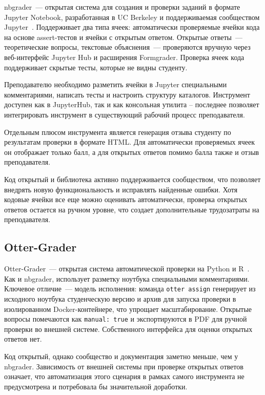 nbgrader~--- открытая система для создания и проверки заданий в формате Jupyter
Notebook, разработанная в UC Berkeley и поддерживаемая сообществом
Jupyter~\cite{nbgrader, nbgrader_github}. Поддерживает два типа ячеек:
автоматически проверяемые ячейки кода на основе assert-тестов и ячейки с
открытым ответом. Открытые ответы~--- теоретические вопросы, текстовые
объяснения~--- проверяются вручную через веб-интерфейс Jupyter Hub и расширения Formgrader.
Проверка ячеек кода поддерживает скрытые тесты, которые не видны студенту.

Преподавателю необходимо разметить ячейки в Jupyter специальными комментариями, написать тесты и настроить
структуру каталогов. Инструмент доступен как в JupyterHub, так и как консольная
утилита -- последнее позволяет интегрировать инструмент в существующий рабочий процесс преподавателя.

Отдельным плюсом инструмента является генерация отзыва студенту по результатам проверки
в формате HTML. Для автоматически проверяемых ячеек он отображает только балл, а для 
открытых ответов помимо балла также и отзыв преподавателя.

Код открытый и библиотека активно поддерживается сообществом, что позволяет внедрять новую функциональность
и исправлять найденные ошибки.
Хотя кодовые ячейки все еще можно оценивать автоматически, проверка открытых ответов остается на ручном уровне, что 
создает дополнительные трудозатраты на преподавателя.

\subsection{Otter-Grader}

Otter-Grader~--- открытая система автоматической проверки на Python и
R~\cite{otter_grader, otter_grader_github}. Как и nbgrader, использует разметку
ноутбука специальными комментариями. Ключевое отличие~--- модель исполнения:
команда \texttt{otter assign} генерирует из исходного ноутбука студенческую
версию и архив для запуска проверки в изолированном Docker-контейнере, что
упрощает масштабирование. Открытые вопросы помечаются как \texttt{manual: true}
и экспортируются в PDF для ручной проверки во внешней системе. Собственного
интерфейса для оценки открытых ответов нет.

Код открытый, однако сообщество и документация заметно меньше, чем у nbgrader.
Зависимость от внешней системы при проверке открытых ответов означает, что
автоматизация этого сценария в рамках самого инструмента не предусмотрена и
потребовала бы значительной доработки.

